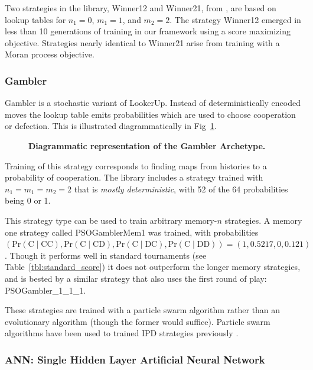 \documentclass[10pt,letterpaper]{article}
\begin{document}
Two strategies in the library, Winner12 and Winner21, from \cite{Mathieu2015},
are based on lookup tables for $n_1 = 0$, $m_1 = 1$, and $m_2=2$. The strategy
Winner12 emerged in less than 10 generations of training in our framework using
a score maximizing objective. Strategies nearly identical to Winner21 arise
from training with a Moran process objective.

\subsubsection*{Gambler}\label{sec:gambler}

Gambler is a stochastic variant of LookerUp. Instead of deterministically
encoded moves the lookup table emits probabilities which are
used to choose cooperation or defection.
This is illustrated diagrammatically in Fig~\ref{fig:gambler}.

\begin{figure}[!hbtp]
    \centering
    \caption{\bf Diagrammatic representation of the Gambler Archetype.}
    \label{fig:gambler}
\end{figure}

Training of this strategy corresponds to finding maps from histories to
a probability of cooperation. The library includes a strategy trained
with $n_1 = m_1 = m_2 = 2$ that is \emph{mostly deterministic}, with 52 of the 64
probabilities being 0 or 1. 

This strategy type can be used to train arbitrary memory-$n$ strategies. A
memory one strategy called PSOGamblerMem1 was trained, with
probabilities $(\text{Pr}(\text{C}\;|\;\text{CC}),
                \text{Pr}(\text{C}\;|\;\text{CD}),
                \text{Pr}(\text{C}\;|\;\text{DC}),
                \text{Pr}(\text{C}\;|\;\text{DD})) = (1, 0.5217, 0, 0.121)$.
Though it performs well in standard tournaments (see
Table~\ref{tbl:standard_score})
it does not outperform the longer memory strategies, and is bested by a similar
strategy that also uses the first round of play: PSOGambler\_1\_1\_1.

These strategies are trained with a particle swarm algorithm rather than an
evolutionary algorithm (though the former would suffice). Particle swarm
algorithms have been used to trained IPD strategies previously
\cite{franken2005particle}.

\subsubsection*{ANN: Single Hidden Layer Artificial Neural Network}\label{sec:ann}
\end{document}
